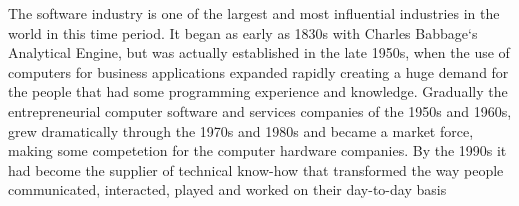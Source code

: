 \documentclass[../computer-history.tex]{subfiles}
\begin{document}
The software industry is one of the largest and most influential industries in the world in this time period. It began as early as 1830s with Charles Babbage‘s Analytical Engine, but was actually established in the late 1950s, when the use of computers for business applications expanded rapidly creating a huge demand for the people that had some programming experience and knowledge. Gradually the entrepreneurial computer software and services companies of the 1950s and 1960s, grew dramatically through the 1970s and 1980s and became a market force, making some competetion for the computer hardware companies. By the 1990s it had become the supplier of technical know-how that transformed the way people communicated, interacted, played and worked on their day-to-day basis

\biblio
\end{document}
